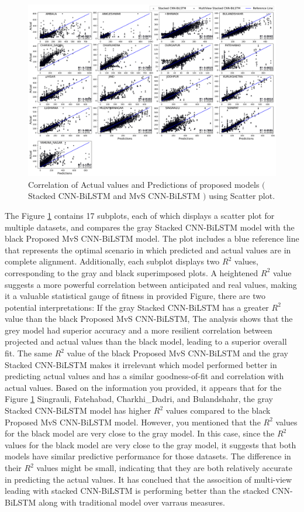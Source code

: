 \documentclass[a4paper,fleqn]{cas-dc}
\begin{document}
\begin{figure}[ht]
	\centering
		\includegraphics[scale=0.35]{img/Scatter_plot}
	  \caption{Correlation of Actual values and Predictions of proposed models $($Stacked CNN-BiLSTM and MvS CNN-BiLSTM $)$ using Scatter plot.}\label{Scatter}
\end{figure}
The Figure \ref{Scatter} contains 17 subplots, each of which displays a scatter plot for multiple datasets, and compares the gray Stacked CNN-BiLSTM model with the black Proposed MvS CNN-BiLSTM model. The plot includes a blue reference line that represents the optimal scenario in which predicted and actual values are in complete alignment. Additionally, each subplot displays two $R^2$ values, corresponding to the gray and black superimposed plots. A heightened $R^2$ value suggests a more powerful correlation between anticipated and real values, making it a valuable statistical gauge of fitness in provided Figure, there are two potential interpretations: If the gray Stacked CNN-BiLSTM has a greater $R^2$ value than the black Proposed MvS CNN-BiLSTM, The analysis shows that the grey model had superior accuracy and a more resilient correlation between projected and actual values than the black model, leading to a superior overall fit. The same $R^2$ value of the black Proposed MvS CNN-BiLSTM and the gray Stacked CNN-BiLSTM makes it irrelevant which model performed better in predicting actual values and has a similar goodness-of-fit and correlation with actual values. Based on the information you provided, it appears that for the Figure \ref{Scatter} Singrauli, Fatehabad, Charkhi\_Dadri, and Bulandshahr, the gray Stacked CNN-BiLSTM model has higher $R^2$ values compared to the black Proposed MvS CNN-BiLSTM model. However, you mentioned that the $R^2$ values for the black model are very close to the gray model. In this case, since the $R^2$ values for the black model are very close to the gray model, it suggests that both models have similar predictive performance for those datasets. The difference in their $R^2$ values might be small, indicating that they are both relatively accurate in predicting the actual values. It has conclued that the assocition of multi-view leading with stacked CNN-BiLSTM is performing better than the stacked CNN-BiLSTM along with traditional model over varraus measures.
\end{document}
